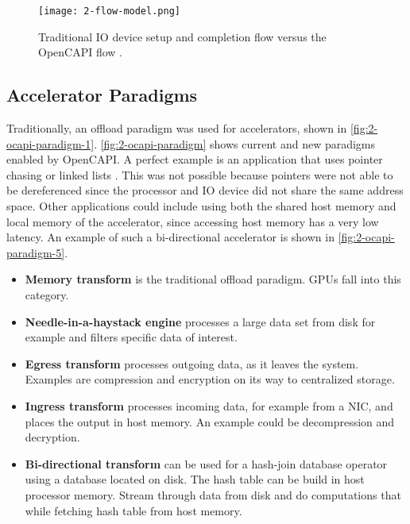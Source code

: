 \begin{figure}[H]
  \centering
  \texttt{[image: 2-flow-model.png]}
  \caption{Traditional IO device setup and completion flow versus the OpenCAPI flow \cite{opencapi-enablement}.}
  \label{fig:2-flow-model}
\end{figure}



\subsection{Accelerator Paradigms}
Traditionally, an offload paradigm was used for accelerators, shown in \autoref{fig:2-ocapi-paradigm-1}. \autoref{fig:2-ocapi-paradigm} shows current and new paradigms enabled by OpenCAPI. A perfect example is an application that uses pointer chasing or linked lists \cite{opencapi-forum}. This was not possible because pointers were not able to be dereferenced since the processor and IO device did not share the same address space. Other applications could include using both the shared host memory and local memory of the accelerator, since accessing host memory has a very low latency. An example of such a bi-directional accelerator is shown in \autoref{fig:2-ocapi-paradigm-5}.

\begin{itemize}
  \item{\textbf{Memory transform} is the traditional offload paradigm. GPUs fall into this category.}
  \item{\textbf{Needle-in-a-haystack engine} processes a large data set from disk for example and filters specific data of interest.}
  \item{\textbf{Egress transform} processes outgoing data, as it leaves the system. Examples are compression and encryption on its way to centralized storage.}
  \item{\textbf{Ingress transform} processes incoming data, for example from a NIC, and places the output in host memory. An example could be decompression and decryption.}
  \item{\textbf{Bi-directional transform} can be used for a hash-join database operator using a database located on disk. The hash table can be build in host processor memory. Stream through data from disk and do computations that while fetching hash table from host memory.}
\end{itemize}


